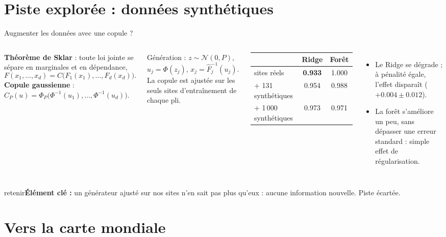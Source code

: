 \documentclass[aspectratio=169,10pt]{beamer}
\newcommand{\retenir}[1]{\vfill\begin{beamercolorbox}[sep=5pt,rounded=true]{retenir}\small\textbf{Élément clé :} #1\end{beamercolorbox}}
\begin{document}
\section{Piste explorée : données synthétiques}

\begin{frame}{Augmenter les données avec une copule ?}
  \begin{columns}[t]
      \small
      \textbf{Théorème de Sklar} : toute loi jointe se sépare en marginales et en dépendance,
      \[ F(x_1,\dots,x_d) = C\big(F_1(x_1),\dots,F_d(x_d)\big). \]
      \textbf{Copule gaussienne} : $C_P(u)=\Phi_P\big(\Phi^{-1}(u_1),\dots,\Phi^{-1}(u_d)\big)$.

      \vspace{0.1cm}
      Génération : $z\sim\mathcal N(0,P)$, $u_j=\Phi(z_j)$, $x_j=\hat F_j^{-1}(u_j)$. La copule est ajustée sur les seuls sites d'entraînement de chaque pli.
      \small
      \begin{tabular}{lcc}
        \toprule
        & Ridge & Forêt \\
        \midrule
        sites réels & \textbf{0.933} & 1.000 \\
        $+$ 131 synthétiques & 0.954 & 0.988 \\
        $+$ 1\,000 synthétiques & 0.973 & 0.971 \\
        \bottomrule
      \end{tabular}
      \begin{itemize}
        \item Le Ridge se dégrade ; à pénalité égale, l'effet disparaît ($+0.004 \pm 0.012$).
        \item La forêt s'améliore un peu, sans dépasser une erreur standard : simple effet de régularisation.
      \end{itemize}
  \end{columns}
  \retenir{un générateur ajusté sur nos sites n'en sait pas plus qu'eux : aucune information nouvelle. Piste écartée.}
\end{frame}

\section{Vers la carte mondiale}
\end{document}
